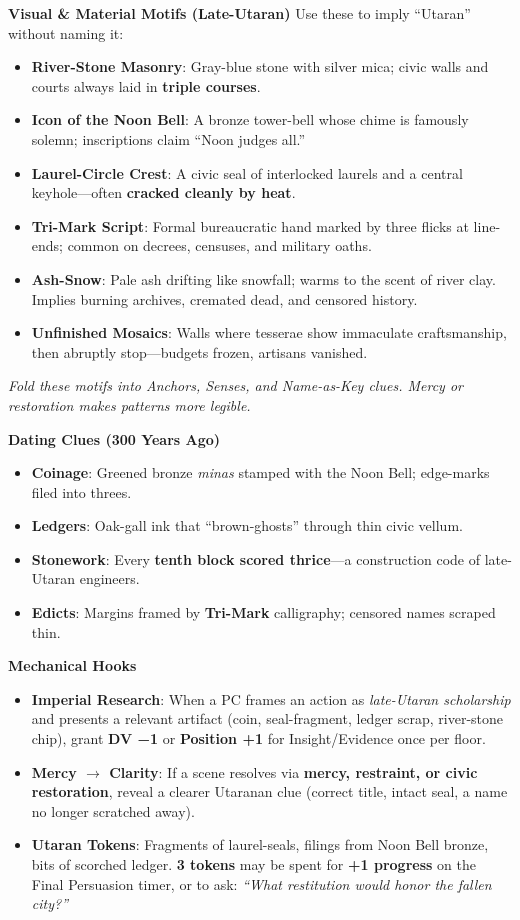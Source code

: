 \documentclass[18pt, letterpaper, twoside]{article}
\begin{document}
\begin{enumerate}
\textbf{Visual \& Material Motifs (Late-Utaran)}
Use these to imply ``Utaran'' without naming it:
\begin{itemize}
    \item \textbf{River-Stone Masonry}: Gray-blue stone with silver mica; civic walls and courts always laid in \textbf{triple courses}.
    \item \textbf{Icon of the Noon Bell}: A bronze tower-bell whose chime is famously solemn; inscriptions claim ``Noon judges all.''
    \item \textbf{Laurel-Circle Crest}: A civic seal of interlocked laurels and a central keyhole---often \textbf{cracked cleanly by heat}.
    \item \textbf{Tri-Mark Script}: Formal bureaucratic hand marked by three flicks at line-ends; common on decrees, censuses, and military oaths.
    \item \textbf{Ash-Snow}: Pale ash drifting like snowfall; warms to the scent of river clay. Implies burning archives, cremated dead, and censored history.
    \item \textbf{Unfinished Mosaics}: Walls where tesserae show immaculate craftsmanship, then abruptly stop---budgets frozen, artisans vanished.
\end{itemize}
\textit{Fold these motifs into Anchors, Senses, and Name-as-Key clues. Mercy or restoration makes patterns more legible.}

\textbf{Dating Clues (300 Years Ago)}
\begin{itemize}
    \item \textbf{Coinage}: Greened bronze \textit{minas} stamped with the Noon Bell; edge-marks filed into threes.
    \item \textbf{Ledgers}: Oak-gall ink that ``brown-ghosts'' through thin civic vellum.
    \item \textbf{Stonework}: Every \textbf{tenth block scored thrice}---a construction code of late-Utaran engineers.
    \item \textbf{Edicts}: Margins framed by \textbf{Tri-Mark} calligraphy; censored names scraped thin.
\end{itemize}

\textbf{Mechanical Hooks}
\begin{itemize}
    \item \textbf{Imperial Research}: When a PC frames an action as \textit{late-Utaran scholarship} and presents a relevant artifact (coin, seal-fragment, ledger scrap, river-stone chip), grant \textbf{DV −1} or \textbf{Position +1} for Insight/Evidence once per floor.
    \item \textbf{Mercy $\rightarrow$ Clarity}: If a scene resolves via \textbf{mercy, restraint, or civic restoration}, reveal a clearer Utaranan clue (correct title, intact seal, a name no longer scratched away).
    \item \textbf{Utaran Tokens}: Fragments of laurel-seals, filings from Noon Bell bronze, bits of scorched ledger. \textbf{3 tokens} may be spent for \textbf{+1 progress} on the Final Persuasion timer, or to ask: \textit{``What restitution would honor the fallen city?''}
\end{itemize}


\end{enumerate}
\end{document}
